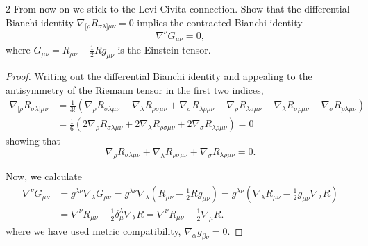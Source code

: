 \documentclass[11pt]{article}
\begin{document}
\begin{problem}{2}
	From now on we stick to the Levi-Civita connection.
	Show that the differential Bianchi identity \(\nabla_{[\rho}R_{\sigma\lambda]\mu\nu}=0\) implies the contracted Bianchi identity
	\begin{equation}
		\label{eq:p2-contracted-bianchi}
		\nabla^\nu G_{\mu\nu}=0,
	\end{equation}
	where \(G_{\mu\nu}=R_{\mu\nu}-\frac12 Rg_{\mu\nu}\) is the Einstein tensor.
\end{problem}
\begin{proof}
	Writing out the differential Bianchi identity and appealing to the antisymmetry of the Riemann tensor in the first two indices,
	\begin{equation}
		\label{eq:p2-explicit-bianchi}
		\begin{aligned}
			\nabla_{[\rho} R_{\sigma\lambda]\mu\nu} & = \frac{1}{3!} \left( \nabla_{\rho}R_{\sigma\lambda\mu\nu} + \nabla_{\lambda} R_{\rho\sigma\mu\nu} + \nabla_{\sigma} R_{\lambda\rho\mu\nu} - \nabla_{\rho} R_{\lambda\sigma\mu\nu} - \nabla_{\lambda} R_{\sigma\rho\mu\nu} - \nabla_{\sigma}R_{\rho\lambda\mu\nu} \right) \\
			                                        & = \frac{1}{6} \left( 2\nabla_{\rho} R_{\sigma\lambda\mu\nu} + 2\nabla_{\lambda}R_{\rho\sigma\mu\nu} + 2\nabla_{\sigma} R_{\lambda\rho\mu\nu} \right) = 0
		\end{aligned}
	\end{equation}
	showing that
	\begin{equation}
		\label{eq:p2-bianchi-zero}
		\nabla_{\rho}R_{\sigma\lambda\mu\nu} + \nabla_{\lambda}R_{\rho\sigma\mu\nu} + \nabla_{\sigma}R_{\lambda\rho\mu\nu} = 0.
	\end{equation}

	Now, we calculate
	\begin{equation}
		\label{eq:p2-diff-bianchi}
		\begin{aligned}
			\nabla^{\nu}G_{\mu\nu} &= g^{\lambda\nu}\nabla_{\lambda}G_{\mu\nu} = g^{\lambda\nu}\nabla_{\lambda}\left( R_{\mu\nu} - \frac{1}{2}Rg_{\mu\nu} \right) = g^{\lambda\nu}\left( \nabla_{\lambda}R_{\mu\nu} - \frac{1}{2}g_{\mu\nu}\nabla_{\lambda}R \right) \\
      &= \nabla^{\nu}R_{\mu\nu} - \frac{1}{2}\delta^{\lambda}_{\mu}\nabla_{\lambda}R = \nabla^{\nu}R_{\mu\nu} - \frac{1}{2}\nabla_{\mu}R.
		\end{aligned}
	\end{equation}
	where we have used metric compatibility, \(\nabla_{\alpha}g_{\beta\nu} = 0\).


\end{proof}
\end{document}

